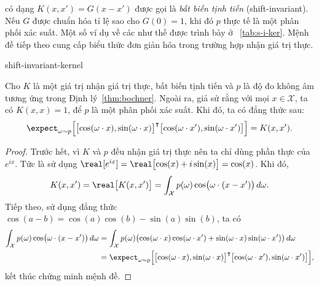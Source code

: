  có dạng $K(x, x') = G(x - x')$ được gọi là  \emph{bất
biến tịnh tiến} (shift-invariant). Nếu $G$ được chuẩn hóa tỉ lệ sao cho $G(0) =
1$, khi đó $p$ thực tế là một phân phối xác suất. Một số ví dụ về các
 như thế được trình bày ở \tablename~\ref{tab:s-i-ker}. Mệnh đề tiếp
theo cung cấp biểu thức đơn giản hóa trong trường hợp  nhận giá trị
thực.

\begin{table}[htbp]
  \centering
  \caption{Ví dụ về một số  bất biến tịnh tiến được chuẩn hóa (định
  nghĩa trên $\mathbf{x}, \mathbf{x}^\prime \in \mathbb{R}^N$) và hàm mật độ
  tương ứng (định nghĩa trên $\boldsymbol{\omega} \in \mathbb{R}^N$).}
  \label{tab:s-i-ker}
  {shift-invariant-kernel}
\end{table}

\begin{prop}\label{prop:expect-real-kernel}
  Cho $K$ là một  giá trị nhận giá trị thực, bất biến tịnh tiến và
  $p$ là độ đo không âm tương ứng trong Định lý~\ref{thm:bochner}. Ngoài ra,
  giả sử rằng với mọi $x \in \mathcal{X}$, ta có $K(x, x) = 1$, để $p$ là một
  phân phối xác suất. Khi đó, ta có đẳng thức sau: \begin{equation}
    \expect_{\omega \sim p}\Bigl[ \bigl[ \cos(\omega \cdot x),
    \sin(\omega \cdot x) \bigr ]^\intercal \bigl[ \cos(\omega
    \cdot x'), \sin(\omega \cdot x') \bigr ] \Bigr ] = K(x, x').
  \end{equation}
\end{prop}

\begin{proof}
  Trước hết, vì $K$ và $p$ đều nhận giá trị thực nên ta chỉ dùng phần thực của
  $e^{ix}$. Tức là sử dụng $\real[e^{ix}] = \real\bigl[ \cos(x) +
  i\sin(x) \bigr] = \cos(x)$. Khi đó, \begin{equation}
    K(x, x') = \real\bigl[ K(x, x') \bigr ] = \int_\mathcal{X} p(\omega)
    \cos \bigl( \omega \cdot (x - x') \bigr )\, d\omega.
  \end{equation} Tiếp theo, sử dụng đẳng thức $\cos(a - b) = \cos(a)\cos(b) -
  \sin(a)\sin(b)$, ta có \begin{align}
    \int_\mathcal{X} p(\omega) \cos\bigl( \omega \cdot ( x - x' ) \bigr ) \,
      d\omega &= \int_\mathcal{X} p(\omega) \bigl( \cos(\omega \cdot x)
      \cos(\omega \cdot x') + \sin(\omega \cdot x) \sin(\omega \cdot x') \bigr
      ) \, d\omega \\
    &= \expect_{\omega \sim p} \Bigl[ \bigl[ \cos(\omega \cdot x), \sin(\omega
    \cdot x) \bigr ]^\intercal \bigl[ \cos(\omega \cdot x'), \sin(\omega \cdot
    x') \bigr] \Bigr ],
  \end{align} kết thúc chứng minh mệnh đề.
\end{proof}

